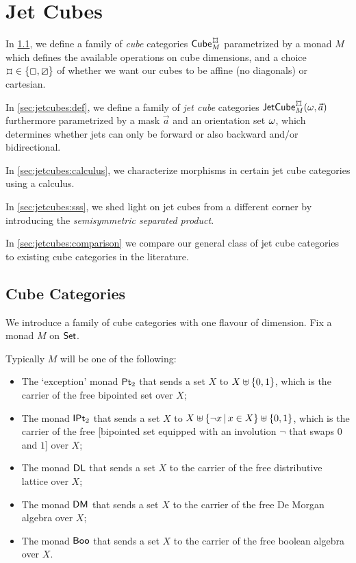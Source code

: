 \documentclass[a4paper]{memoir}
\begin{document}
\section{Jet Cubes} \label{sec:jetcubes}
In \cref{sec:cubes}, we define a family of \emph{cube} categories $\cubecat_M^\mycubex$ parametrized by a monad $M$ which defines the available operations on cube dimensions, and a choice $\mycubex \in \accol{\affine, \cartes}$ of whether we want our cubes to be affine (no diagonals) or cartesian.

In \cref{sec:jetcubes:def}, we define a family of \emph{jet cube} categories $\jetcube{\myorix}{\mycubex}{M}{\vec a}$ furthermore parametrized by a mask $\vec a$ and an orientation set $\omega$, which determines whether jets can only be forward or also backward and/or bidirectional.

In \cref{sec:jetcubes:calculus}, we characterize morphisms in certain jet cube categories using a calculus.

In \cref{sec:jetcubes:sss}, we shed light on jet cubes from a different corner by introducing the \emph{semisymmetric separated product}.

In \cref{sec:jetcubes:comparison} we compare our general class of jet cube categories to existing cube categories in the literature.

\subsection{Cube Categories} \label{sec:cubes}
We introduce a family of cube categories with one flavour of dimension. Fix a monad $M$ on ${\mathsf{Set}}$.
\begin{example} \label{ex:cube-monads}
	Typically $M$ will be one of the following:
	\begin{itemize}
		\item The `exception' monad ${\mathsf{Pt}_2}$ that sends a set $X$ to $X \uplus \mathopen{}\left\{ 0,1 \right\}\mathclose{}$, which is the carrier of the free bipointed set over $X$;
		\item The monad ${\mathsf{IPt}_2}$ that sends a set $X$ to $X \uplus \mathopen{}\left\{ \lnot x \,\middle|\, x \in X \right\}\mathclose{} \uplus \mathopen{}\left\{ 0, 1 \right\}\mathclose{}$, which is the carrier of the free [bipointed set equipped with an involution $\lnot$ that swaps $0$ and $1$] over $X$;
		\item The monad $\mathsf{DL}$ that sends a set $X$ to the carrier of the free distributive lattice over $X$;
		\item The monad $\mathsf{DM}$ that sends a set $X$ to the carrier of the free De Morgan algebra over $X$;
		\item The monad $\mathsf{Boo}$ that sends a set $X$ to the carrier of the free boolean algebra over $X$.
	\end{itemize}
\end{example}
\end{document}
